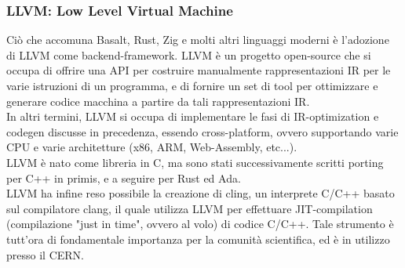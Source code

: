\subsubsection{LLVM: Low Level Virtual Machine}
Ciò che accomuna Basalt, Rust, Zig e molti altri linguaggi moderni è l'adozione di LLVM 
come backend-framework. LLVM è un progetto open-source che si occupa di offrire una API 
per costruire manualmente rappresentazioni IR per le varie istruzioni di un programma, 
e di fornire un set di tool per ottimizzare e generare codice macchina a partire
da tali rappresentazioni IR. \\ 

In altri termini, LLVM si occupa di implementare le fasi di IR-optimization e 
codegen discusse in precedenza, essendo cross-platform, ovvero supportando 
varie CPU e varie architetture (x86, ARM, Web-Assembly, etc...). \\

LLVM è nato come libreria in C, ma sono stati successivamente scritti porting 
per C++ in primis, e a seguire per Rust ed Ada. \\

LLVM ha infine reso possibile la creazione di cling, un interprete C/C++ basato 
sul compilatore clang, il quale utilizza LLVM per effettuare JIT-compilation 
(compilazione "just in time", ovvero al volo) di codice C/C++. Tale 
strumento è tutt'ora di fondamentale importanza per la comunità scientifica, 
ed è in utilizzo presso il CERN.